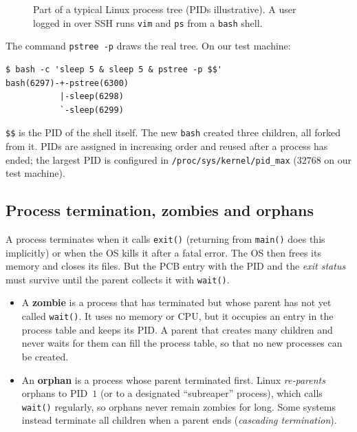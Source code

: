 \documentclass[11pt,a4paper]{article}
\newcommand{\term}[1]{\textbf{\color{mintdeep}#1}}
\newcommand{\cmd}[1]{\texttt{#1}}
\begin{document}
\begin{figure}[H]
\centering
{}
\caption{Part of a typical Linux process tree (PIDs illustrative). A user logged in over SSH runs \cmd{vim} and \cmd{ps} from a \cmd{bash} shell.}
\end{figure}

The command \cmd{pstree -p} draws the real tree. On our test machine:
\begin{lstlisting}[style=term]
$ bash -c 'sleep 5 & sleep 5 & pstree -p $$'
bash(6297)-+-pstree(6300)
           |-sleep(6298)
           `-sleep(6299)
\end{lstlisting}
\verb|$$| is the PID of the shell itself. The new \cmd{bash} created three children, all forked from it. PIDs are assigned in increasing order and reused after a process has ended; the largest PID is configured in \nolinkurl{/proc/sys/kernel/pid_max} ($32768$ on our test machine).

\subsection{Process termination, zombies and orphans}
\label{sec:zombie}

A process terminates when it calls \cmd{exit()} (returning from \cmd{main()} does this implicitly) or when the OS kills it after a fatal error. The OS then frees its memory and closes its files. But the PCB entry with the PID and the \emph{exit status} must survive until the parent collects it with \cmd{wait()}.

\begin{itemize}
  \item A \term{zombie} is a process that has terminated but whose parent has not yet called \cmd{wait()}. It uses no memory or CPU, but it occupies an entry in the process table and keeps its PID. A parent that creates many children and never waits for them can fill the process table, so that no new processes can be created.
  \item An \term{orphan} is a process whose parent terminated first. Linux \emph{re-parents} orphans to PID~$1$ (or to a designated ``subreaper'' process), which calls \cmd{wait()} regularly, so orphans never remain zombies for long. Some systems instead terminate all children when a parent ends (\emph{cascading termination}).
\end{itemize}
\end{document}
